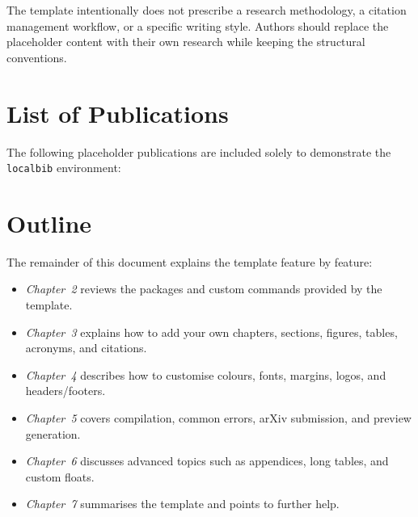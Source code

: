 The template intentionally does not prescribe a research methodology, a citation management workflow, or a specific writing style. Authors should replace the placeholder content with their own research while keeping the structural conventions.


\section{List of Publications}\label{ch1sec:publications}

The following placeholder publications are included solely to demonstrate the \texttt{localbib} environment:

\begin{localbib}
\nocite{placeholder2024demo, placeholder2024template}
\end{localbib}


\section{Outline}\label{ch1sec:outline}

The remainder of this document explains the template feature by feature:

\begin{itemize}
\item \emph{Chapter~2} reviews the packages and custom commands provided by the template.
\item \emph{Chapter~3} explains how to add your own chapters, sections, figures, tables, acronyms, and citations.
\item \emph{Chapter~4} describes how to customise colours, fonts, margins, logos, and headers/footers.
\item \emph{Chapter~5} covers compilation, common errors, arXiv submission, and preview generation.
\item \emph{Chapter~6} discusses advanced topics such as appendices, long tables, and custom floats.
\item \emph{Chapter~7} summarises the template and points to further help.
\end{itemize}
